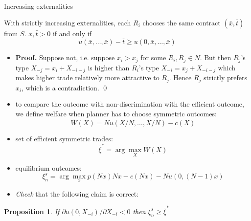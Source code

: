 \documentclass[11pt,english]{beamer}
\newcommand{\dif}{\partial}
\newtheorem{proposition}{Proposition}
\begin{document}
\begin{frame}[allowframebreaks]{Increasing externalities}
  \begin{lemma}
    With strictly increasing externalities, each $R_i$ chooses the
    same contract $(\bar{x},\bar{t})$ from $S$.  $\bar{x},\bar{t}>0$
    if and only if
    \begin{equation*}
      u(\bar{x},\ldots,\bar{x}) - \bar{t} \geq u(0,\bar{x},\ldots,\bar{x})
    \end{equation*}
  \end{lemma}
  \begin{itemize}
  \item \textbf{Proof.} Suppose not, i.e. suppose $x_i > x_j$ for some
    $R_i,R_j \in N$. But then $R_j$'s type $X_{-j}=x_i+X_{-i-j}$ is higher
    than $R_i$'s type $X_{-i}=x_j+X_{-i-j}$ which makes higher trade
    relatively more attractive to $R_j$. Hence $R_j$ strictly prefers
    $x_i$, which is a contradiction. \qed
  \item to compare the outcome with non-discrimination with the
    efficient outcome,
    we define welfare when planner has to choose symmetric outcomes:
    \begin{equation}
      \label{eq:S03aSymmetricWelfare}
      \bar{W}(X)=Nu(X/N,\ldots,X/N)-c(X)
    \end{equation}
  \item set of efficient symmetric trades:
    \begin{equation}
      \label{eq:S03aOptimalSymmetricTrades}
      \bar{\xi}^*=\arg\max_X \bar{W}(X)
    \end{equation}
  \item equilibrium outcomes:
    \begin{equation}
      \label{eq:S03axins}
      \xi_n^s = \arg\max_x p(Nx)Nx-c(Nx)-Nu(0,(N-1)x)
    \end{equation}
  \item \emph{Check} that the following claim is correct:
  \end{itemize}
  \begin{proposition}
    If $\dif u(0,X_{-i})/\dif X_{-i} <0$ then $\xi_n^s \geq \bar{\xi}^*$
  \end{proposition}
\end{frame}
\end{document}
